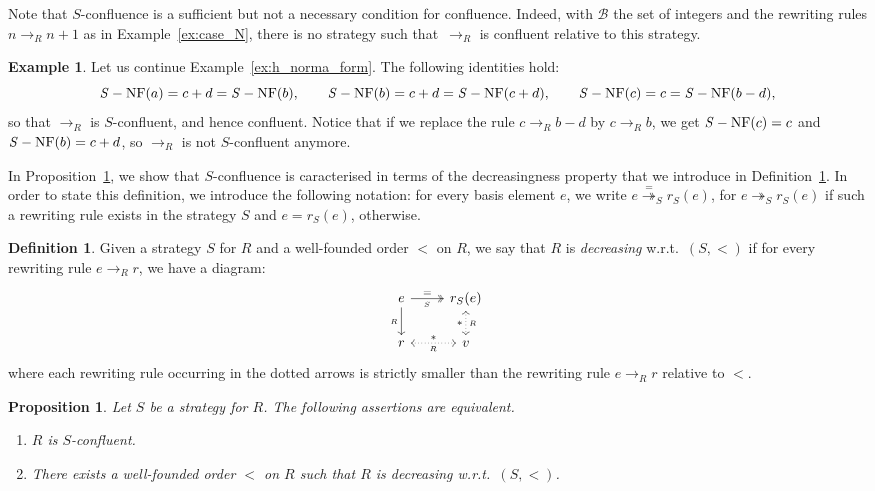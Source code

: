 \documentclass[10pt]{easychair}
\newtheorem{proposition}[theorem]{Proposition}
\theoremstyle{definition}
\newtheorem{definition}[theorem]{Definition}
\newtheorem{example}[theorem]{Example}
\newcommand\basis{\mathscr{B}}
\newcommand\rewR{\to_R}
\newcommand\rewS{\twoheadrightarrow_S}
\DeclareMathOperator{\SNF}{{\it S}-NF}
\begin{document}
Note that $S$-confluence is a sufficient but not a necessary condition for
confluence. Indeed, with $\basis$ the set of integers and the rewriting rules
$n\rewR n+1$ as in Example~\ref{ex:case_N}, there is no strategy such
that~$\rewR$ is confluent relative to this strategy.  \smallskip

\begin{example}\label{ex:S-conf}
  Let us continue Example~\ref{ex:h_norma_form}. The following identities
  hold:
  \[\SNF(a)=c+d=\SNF(b),\qquad\SNF(b)=c+d=\SNF(c+d),\qquad
  \SNF(c)=c=\SNF(b-d),
  \smallskip\]
  so that $\rewR$ is $S$-confluent, and hence confluent. Notice that if
  we replace the rule $c\rewR b-d$ by $c\rewR b$, we get $\SNF(c)=c$ and
  $\SNF(b)=c+d$, so $\rewR$ is not $S$-confluent anymore. 
\end{example}
\smallskip

In Proposition~\ref{prop:S-conf_decreasing}, we show that $S$-confluence
is caracterised in terms of the decreasingness property that we introduce
in Definition~\ref{def:decreasing}. In order to state this definition, we
introduce the following notation: for every basis element $e$, we write
$e\overset{=}{\twoheadrightarrow}_Sr_S(e)$, for $e\rewS r_S(e)$ if such a
rewriting rule exists in the strategy $S$ and $e=r_S(e)$, otherwise.
\smallskip

\begin{definition}\label{def:decreasing}
  Given a strategy $S$ for $R$ and a well-founded order $<$ on $R$,
  we say that $R$ is {\em decreasing} w.r.t.\ $(S,<)$ if for every
  rewriting rule $e\rewR r$, we have a diagram:
  \[\begin{tikzcd}
      e\ar[d, "_R"']\ar[r, twoheadrightarrow, "=", "_S"'] &
      r_S(e)\ar[d, leftrightarrow, dotted, "*"', "_R"]\\
      r\ar[r, leftrightarrow, dotted, "*", "_R"'] & v
    \end{tikzcd}\]
  where each rewriting rule occurring in the dotted arrows is strictly
  smaller than the rewriting rule $e\rewR r$ relative to $<$.
\end{definition}
\smallskip

\begin{proposition}\label{prop:S-conf_decreasing}
  Let $S$ be a strategy for $R$. The following assertions are equivalent.
  \begin{enumerate}
  \item $R$ is $S$-confluent.
  \item There exists a well-founded order $<$ on $R$ such that $R$ is
    decreasing w.r.t.\ $(S,<)$.
  \end{enumerate}
\end{proposition}
\end{document}
